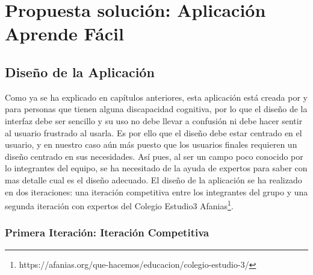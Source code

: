 \chapter{Propuesta solución: Aplicación Aprende Fácil}
\label{cap:aprendeFacil}


\section{Diseño de la Aplicación}
\label{cap:sec:disenioInterfaz}
Como ya se ha explicado en capítulos anteriores, esta aplicación está creada por y para personas que tienen alguna discapacidad cognitiva, por lo que el diseño de la interfaz debe ser sencillo y su uso no debe llevar a confusión ni debe hacer sentir al usuario frustrado al usarla. 
Es por ello que el diseño debe estar centrado en el usuario, y en nuestro caso aún más puesto que los usuarios finales requieren un diseño centrado en sus necesidades. Así pues, al ser un campo poco conocido por lo integrantes del equipo, se ha necesitado de la ayuda de expertos para saber con mas detalle cual es el diseño adecuado. 
El diseño de la aplicación se ha realizado en dos iteraciones: una iteración competitiva entre los integrantes del grupo y una segunda iteración con expertos del Colegio Estudio3 Afanias\footnote{https://afanias.org/que-hacemos/educacion/colegio-estudio-3/}. 


\subsection{Primera Iteración: Iteración Competitiva}
\label{cap:subsec:iteracionCompetitiva}

